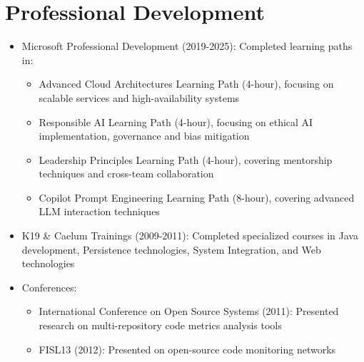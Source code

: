 
\section{Professional Development}
\begin{itemize}
    \item \small{Microsoft Professional Development (2019-2025):}
      \footnotesize{Completed learning paths in:}
      \begin{itemize}[itemsep=1pt, parsep=0pt]
          \item \footnotesize{Advanced Cloud Architectures Learning Path (4-hour), focusing on scalable \lowercase{\BackEndWriting} services and high-availability systems}
          \item \footnotesize{Responsible AI Learning Path (4-hour), focusing on ethical AI implementation, governance and bias mitigation}
          \item \footnotesize{Leadership Principles Learning Path (4-hour), covering mentorship techniques and cross-team collaboration}
          \item \footnotesize{Copilot Prompt Engineering Learning Path (8-hour), covering advanced LLM interaction techniques}
      \end{itemize}
    \item \small{K19 \& Caelum Trainings (2009-2011):} \footnotesize{Completed specialized courses in Java development, Persistence technologies, System Integration, and Web technologies}
    \item \small{Conferences:}
          \begin{itemize}[itemsep=1pt, parsep=0pt]
              \item \footnotesize{International Conference on Open Source Systems (2011): Presented research on multi-repository code metrics analysis tools}
              \item \footnotesize{FISL13 (2012): Presented on open-source code monitoring networks}
          \end{itemize}
\end{itemize}